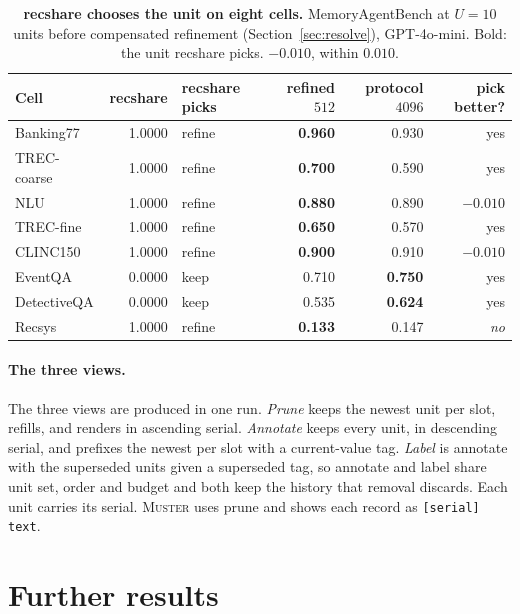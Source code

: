 \documentclass{article}
\newcommand{\tabfont}{\fontsize{7.5}{8.5}\selectfont\renewcommand{\arraystretch}{1.0}}
\newcommand{\sys}{\textsc{Muster}}
\newcommand{\cov}{\textsf{recshare}}
\begin{document}
\begin{table}[H]
\centering\tabfont
\caption{\textbf{\cov{} chooses the unit on eight cells.} MemoryAgentBench at $U=10$ units before compensated refinement (Section~\ref{sec:resolve}), GPT-4o-mini. Bold: the unit \cov{} picks. $-0.010$, within $0.010$.}
\label{tab:refine}
\setlength{\tabcolsep}{4pt}\setlength{\aboverulesep}{0pt}\setlength{\belowrulesep}{0pt}\setlength{\extrarowheight}{0.8pt}
\begin{tabular}{lrlrrr}
\toprule
Cell & \cov & \cov{} picks & refined $512$ & protocol $4096$ & pick better? \\
\midrule
Banking77 & 1.0000 & refine & \cellcolor{oursbg}\textbf{0.960} & 0.930 & yes \\
TREC-coarse & 1.0000 & refine & \cellcolor{oursbg}\textbf{0.700} & 0.590 & yes \\
NLU & 1.0000 & refine & \cellcolor{oursbg}\textbf{0.880} & 0.890 & $-0.010$ \\
TREC-fine & 1.0000 & refine & \cellcolor{oursbg}\textbf{0.650} & 0.570 & yes \\
CLINC150 & 1.0000 & refine & \cellcolor{oursbg}\textbf{0.900} & 0.910 & $-0.010$ \\
EventQA & 0.0000 & keep & 0.710 & \cellcolor{oursbg}\textbf{0.750} & yes \\
DetectiveQA & 0.0000 & keep & 0.535 & \cellcolor{oursbg}\textbf{0.624} & yes \\
Recsys & 1.0000 & refine & \cellcolor{oursbg}\textbf{0.133} & 0.147 & \emph{no} \\
\bottomrule
\end{tabular}
\end{table}

\paragraph{The three views.}

The three views are produced in one run. \emph{Prune} keeps the newest unit per slot, refills, and
renders in ascending serial. \emph{Annotate} keeps every unit, in descending serial, and prefixes the
newest per slot with a current-value tag. \emph{Label} is annotate with the superseded units given a
superseded tag, so annotate and label share unit set, order and budget and both keep the history
that removal discards. Each unit carries its serial. \sys{} uses prune and shows each record as
\texttt{[serial] text}.

\section{Further results}\label{app:more}
\end{document}
